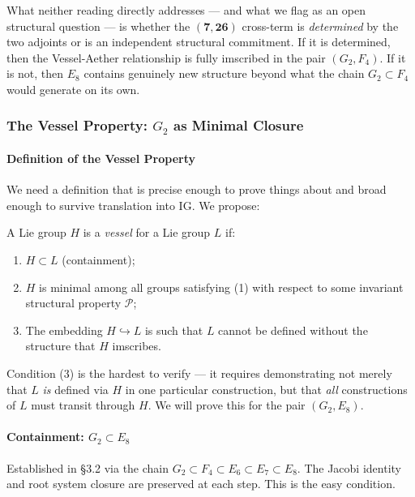 \documentclass[12pt,a4paper]{article}
\newcommand{\pilcrow}{\S}
\begin{document}
What neither reading directly addresses --- and what we flag as an open structural question --- is whether the $(\mathbf{7}, \mathbf{26})$ cross-term is \emph{determined} by the two adjoints or is an independent structural commitment. If it is determined, then the Vessel-Aether relationship is fully imscribed in the pair $(G_2, F_4)$. If it is not, then $E_8$ contains genuinely new structure beyond what the chain $G_2 \subset F_4$ would generate on its own.

\subsubsection{The Vessel Property: \texorpdfstring{$G_2$}{G_2} as Minimal Closure}

\paragraph{Definition of the Vessel Property}

We need a definition that is precise enough to prove things about and broad enough to survive translation into IG. We propose:

A Lie group $H$ is a \emph{vessel} for a Lie group $L$ if:

\begin{enumerate}
    \item $H \subset L$ (containment);
    \item $H$ is minimal among all groups satisfying (1) with respect to some invariant structural property $\mathcal{P}$;
    \item The embedding $H \hookrightarrow L$ is such that $L$ cannot be defined without the structure that $H$ imscribes.
\end{enumerate}

Condition (3) is the hardest to verify --- it requires demonstrating not merely that $L$ \emph{is} defined via $H$ in one particular construction, but that \emph{all} constructions of $L$ must transit through $H$. We will prove this for the pair $(G_2, E_8)$.

\paragraph{Containment: $G_2 \subset E_8$}

Established in \pilcrow{}3.2 via the chain $G_2 \subset F_4 \subset E_6 \subset E_7 \subset E_8$. The Jacobi identity and root system closure are preserved at each step. This is the easy condition.
\end{document}
